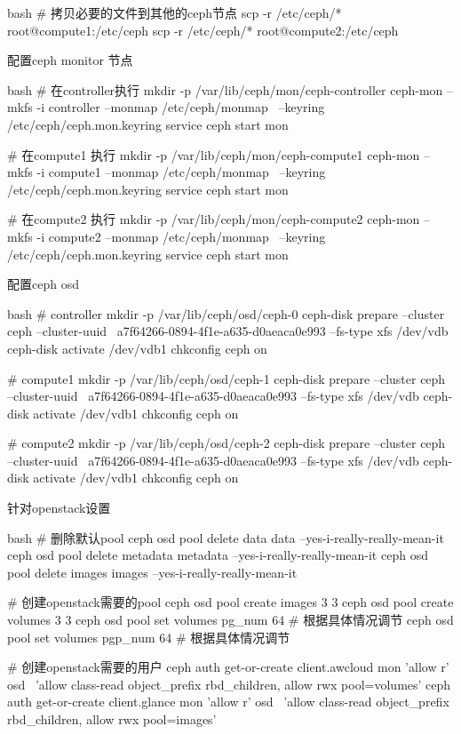 \begin{outline}[enumerate]
\begin{code-block}{bash}
# 拷贝必要的文件到其他的ceph节点
scp -r /etc/ceph/* root@compute1:/etc/ceph
scp -r /etc/ceph/* root@compute2:/etc/ceph
\end{code-block}

  \1 配置ceph monitor 节点
\begin{code-block}{bash}
# 在controller执行
mkdir -p /var/lib/ceph/mon/ceph-controller
ceph-mon --mkfs -i controller --monmap /etc/ceph/monmap \
    --keyring /etc/ceph/ceph.mon.keyring
service ceph start mon

# 在compute1 执行
mkdir -p /var/lib/ceph/mon/ceph-compute1
ceph-mon --mkfs -i compute1 --monmap /etc/ceph/monmap \
    --keyring /etc/ceph/ceph.mon.keyring
service ceph start mon

# 在compute2 执行
mkdir -p /var/lib/ceph/mon/ceph-compute2
ceph-mon --mkfs -i compute2 --monmap /etc/ceph/monmap \
    --keyring /etc/ceph/ceph.mon.keyring
service ceph start mon
\end{code-block}

  \1 配置ceph osd
\begin{code-block}{bash}
# controller
mkdir -p /var/lib/ceph/osd/ceph-0
ceph-disk prepare --cluster ceph --cluster-uuid \
    a7f64266-0894-4f1e-a635-d0aeaca0e993 --fs-type xfs  /dev/vdb
ceph-disk activate /dev/vdb1
chkconfig ceph on

# compute1
mkdir -p /var/lib/ceph/osd/ceph-1
ceph-disk prepare --cluster ceph --cluster-uuid \
    a7f64266-0894-4f1e-a635-d0aeaca0e993 --fs-type xfs  /dev/vdb
ceph-disk activate /dev/vdb1
chkconfig ceph on

# compute2
mkdir -p /var/lib/ceph/osd/ceph-2
ceph-disk prepare --cluster ceph --cluster-uuid \
    a7f64266-0894-4f1e-a635-d0aeaca0e993 --fs-type xfs  /dev/vdb
ceph-disk activate /dev/vdb1
chkconfig ceph on
\end{code-block}

  \1 针对openstack设置
\begin{code-block}{bash}
# 删除默认pool
ceph osd pool delete data  data --yes-i-really-really-mean-it
ceph osd pool delete metadata metadata --yes-i-really-really-mean-it
ceph osd pool delete images images --yes-i-really-really-mean-it

# 创建openstack需要的pool
ceph osd pool create images 3 3
ceph osd pool create volumes 3 3
ceph osd pool set volumes pg_num 64  # 根据具体情况调节
ceph osd pool set volumes pgp_num 64 # 根据具体情况调节

# 创建openstack需要的用户
ceph auth get-or-create client.awcloud mon 'allow r' osd \
    'allow class-read object_prefix rbd_children, allow rwx pool=volumes'
ceph auth get-or-create client.glance mon 'allow r' osd \
    'allow class-read object_prefix rbd_children, allow rwx pool=images'


\end{code-block}
\end{outline}
